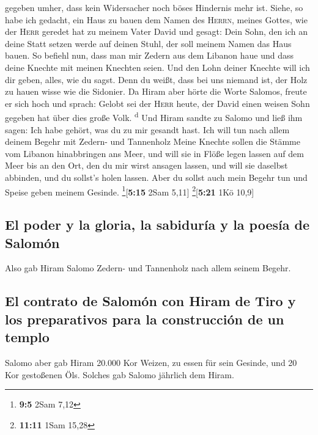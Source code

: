 gegeben umher, dass kein Widersacher noch böses Hindernis mehr ist.
 Siehe, so habe ich gedacht, ein Haus zu bauen dem Namen
des \textsc{Herrn}, meines Gottes, wie der \textsc{Herr} geredet hat zu
meinem Vater David und gesagt: Dein Sohn, den ich an deine Statt setzen
werde auf deinen Stuhl, der soll meinem Namen das Haus bauen.
 So befiehl nun, dass man mir Zedern aus dem Libanon haue
und dass deine Knechte mit meinen Knechten seien. Und den Lohn deiner
Knechte will ich dir geben, alles, wie du sagst. Denn du weißt, dass bei
uns niemand ist, der Holz zu hauen wisse wie die Sidonier.
 Da Hiram aber hörte die Worte Salomos, freute er sich
hoch und sprach: Gelobt sei der \textsc{Herr} heute, der David einen
weisen Sohn gegeben hat über dies große Volk. \textsuperscript{d}
 Und Hiram sandte zu Salomo und ließ ihm sagen: Ich habe
gehört, was du zu mir gesandt hast. Ich will tun nach allem deinem
Begehr mit Zedern- und Tannenholz  Meine Knechte sollen
die Stämme vom Libanon hinabbringen ans Meer, und will sie in Flöße
legen lassen auf dem Meer bis an den Ort, den du mir wirst ansagen
lassen, und will sie daselbst abbinden, und du sollst's holen lassen.
Aber du sollst auch mein Begehr tun und Speise geben meinem Gesinde.
\footnote{\textbf{9:5} 2Sam 7,12}{[}\textbf{5:15} 2Sam 5,11{]}
\footnote{\textbf{11:11} 1Sam 15,28}{[}\textbf{5:21} 1Kö 10,9{]}

\hypertarget{el-poder-y-la-gloria-la-sabiduruxeda-y-la-poesuxeda-de-salomuxf3n}{%
\subsection{El poder y la gloria, la sabiduría y la poesía de
Salomón}\label{el-poder-y-la-gloria-la-sabiduruxeda-y-la-poesuxeda-de-salomuxf3n}}

 Also gab Hiram Salomo Zedern- und Tannenholz nach allem
seinem Begehr.

\hypertarget{el-contrato-de-salomuxf3n-con-hiram-de-tiro-y-los-preparativos-para-la-construcciuxf3n-de-un-templo}{%
\subsection{El contrato de Salomón con Hiram de Tiro y los preparativos
para la construcción de un
templo}\label{el-contrato-de-salomuxf3n-con-hiram-de-tiro-y-los-preparativos-para-la-construcciuxf3n-de-un-templo}}

 Salomo aber gab Hiram 20.000 Kor Weizen, zu essen für
sein Gesinde, und 20 Kor gestoßenen Öls. Solches gab Salomo jährlich dem
Hiram.

